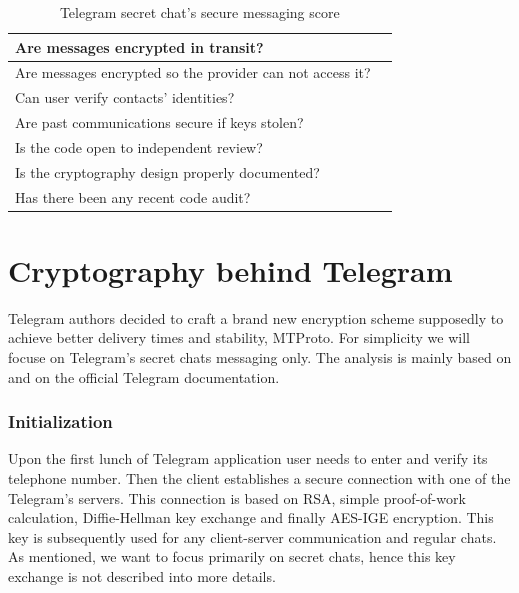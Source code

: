 \documentclass[thesis=M,english]{FITthesis}[2012/10/20]
\newcommand{\cmark}{\ding{51}}%
\begin{document}
\begin{table}[htb]
	\centering
	\caption{Telegram secret chat's secure messaging score}
	\label{tab:telegram-secret-eff}
	\begin{tabular}{|l|l|}
		\hline
		Are messages encrypted in transit? & \cmark \\\hline
		Are messages encrypted so the provider can not access it? & \cmark \\ \hline
		Can user verify contacts' identities? & \cmark \\ \hline
		Are past communications secure if keys stolen? & \cmark \\ \hline
		Is the code open to independent review? & \cmark \\ \hline
		Is the cryptography design properly documented? & \cmark \\ \hline
		Has there been any recent code audit? & \cmark \\ \hline
	\end{tabular}
\end{table}







\chapter{Cryptography behind Telegram}\label{telegramcrypto}

Telegram authors decided to craft a brand new encryption scheme supposedly to achieve better delivery times and stability, MTProto. For simplicity we will focuse on Telegram's secret chats messaging only. The analysis is mainly based on \cite{telegram-aarhus} and on the official Telegram documentation. 


\subsection{Initialization}\label{crypto-initialization}

Upon the first lunch of Telegram application user needs to enter and verify its telephone number. Then the client establishes a secure connection with one of the Telegram's servers. This connection is based on RSA, simple proof-of-work calculation, Diffie-Hellman key exchange and finally AES-IGE encryption. This key is subsequently used for any client-server communication and regular chats. As mentioned, we want to focus primarily on secret chats, hence this key exchange is not described into more details.
\end{document}

